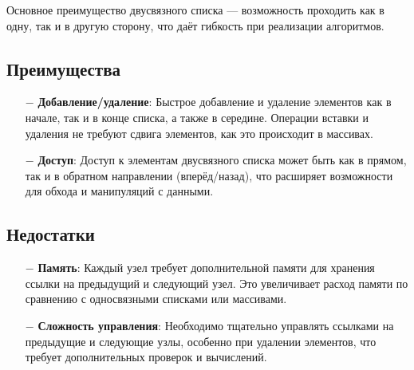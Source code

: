 \documentclass[oneside,a4paper,14pt]{extarticle}
\begin{document}
\noindent Основное преимущество двусвязного списка — возможность проходить как в одну, так и в другую сторону, что даёт гибкость при реализации алгоритмов.

\subsection*{Преимущества}
\begin{itemize}
    \item[$-$] \textbf{Добавление/удаление}: Быстрое добавление и удаление элементов как в начале, так и в конце списка, а также в середине. Операции вставки и удаления не требуют сдвига элементов, как это происходит в массивах.
    \item[$-$] \textbf{Доступ}: Доступ к элементам двусвязного списка может быть как в прямом, так и в обратном направлении (вперёд/назад), что расширяет возможности для обхода и манипуляций с данными.
\end{itemize}

\subsection*{Недостатки}
\begin{itemize}
    \item[$-$] \textbf{Память}: Каждый узел требует дополнительной памяти для хранения ссылки на предыдущий и следующий узел. Это увеличивает расход памяти по сравнению с односвязными списками или массивами.
    \item[$-$] \textbf{Сложность управления}: Необходимо тщательно управлять ссылками на предыдущие и следующие узлы, особенно при удалении элементов, что требует дополнительных проверок и вычислений.
\end{itemize}
\end{document}
